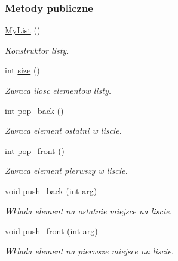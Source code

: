\subsubsection*{Metody publiczne}
\begin{DoxyCompactItemize}
\item 
\hyperlink{class_my_list_ae9cd2a6b068e02fa39ba3e539425c1c1}{My\-List} ()
\begin{DoxyCompactList}\small\item\em Konstruktor listy. \end{DoxyCompactList}\item 
int \hyperlink{class_my_list_a6d21c8bfbd9cd31efdba81ba488f43f2}{size} ()
\begin{DoxyCompactList}\small\item\em Zwraca ilosc elementow listy. \end{DoxyCompactList}\item 
int \hyperlink{class_my_list_a7361ad3b0da0402cb95adb225ebfaffd}{pop\-\_\-back} ()
\begin{DoxyCompactList}\small\item\em Zwraca element ostatni w liscie. \end{DoxyCompactList}\item 
int \hyperlink{class_my_list_ae038b14e6cb5b54b8499b85ce5f03a0e}{pop\-\_\-front} ()
\begin{DoxyCompactList}\small\item\em Zwraca element pierwszy w liscie. \end{DoxyCompactList}\item 
void \hyperlink{class_my_list_a8428cca9d08fcf02e378aee0a232e971}{push\-\_\-back} (int arg)
\begin{DoxyCompactList}\small\item\em Wklada element na ostatnie miejsce na liscie. \end{DoxyCompactList}\item 
void \hyperlink{class_my_list_a9ab5ae823e85df90662e42fab4229f09}{push\-\_\-front} (int arg)
\begin{DoxyCompactList}\small\item\em Wklada element na pierwsze miejsce na liscie. \end{DoxyCompactList}\end{DoxyCompactItemize}

